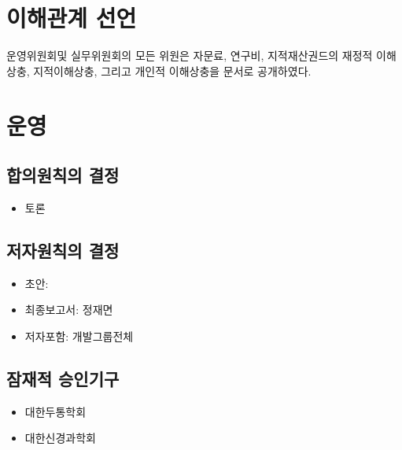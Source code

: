 \documentclass[]{book}
\providecommand{\tightlist}{%
  \setlength{\itemsep}{0pt}\setlength{\parskip}{0pt}}
\begin{document}
\hypertarget{section-34}{%
\section*{이해관계 선언}\label{section-34}}

운영위원회및 실무위원회의 모든 위원은 자문료, 연구비, 지적재산권드의 재정적 이해상충, 지적이해상충, 그리고 개인적 이해상충을 문서로 공개하였다.

\hypertarget{section-35}{%
\section*{운영}\label{section-35}}

\hypertarget{section-36}{%
\subsection*{합의원칙의 결정}\label{section-36}}

\begin{itemize}
\tightlist
\item
  토론
\end{itemize}

\hypertarget{section-37}{%
\subsection*{저자원칙의 결정}\label{section-37}}

\begin{itemize}
\tightlist
\item
  초안:
\item
  최종보고서: 정재면
\item
  저자포함: 개발그룹전체
\end{itemize}

\hypertarget{section-38}{%
\subsection*{잠재적 승인기구}\label{section-38}}

\begin{itemize}
\tightlist
\item
  대한두통학회
\item
  대한신경과학회
\end{itemize}
\end{document}
